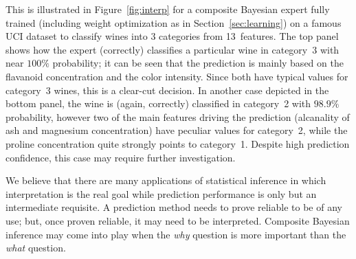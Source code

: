 \documentclass[english]{scrartcl}
\begin{document}
This is illustrated in Figure~\ref{fig:interp} for a composite Bayesian expert fully trained (including weight optimization as in Section~\ref{sec:learning}) on a famous UCI dataset \cite{Aeberhard-92} to classify wines into 3 categories from 13~features. The top panel shows how the expert (correctly) classifies a particular wine in category~3 with near $100\%$ probability; it can be seen that the prediction is mainly based on the flavanoid concentration and the color intensity. Since both have typical values for category~3 wines, this is a clear-cut decision. In another case depicted in the bottom panel, the wine is (again, correctly) classified in category~2 with $98.9\%$ probability, however two of the main features driving the prediction (alcanality of ash and magnesium concentration) have peculiar values for category~2, while the proline concentration quite strongly points to category~1. Despite high prediction confidence, this case may require further investigation.

We believe that there are many applications of statistical inference in which interpretation is the real goal while prediction performance is only but an intermediate requisite. A prediction method needs to prove reliable to be of any use; but, once proven reliable, it may need to be interpreted. Composite Bayesian inference may come into play when the {\em why} question is more important than the {\em what} question.


\end{document}
